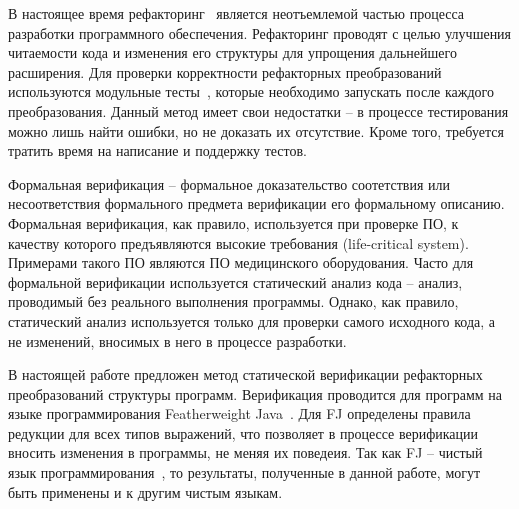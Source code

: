 \startprefacepage

В настоящее время рефакторинг~\cite{refactoring} является неотъемлемой частью процесса разработки программного обеспечения.
Рефакторинг проводят с целью улучшения читаемости кода и изменения его структуры для упрощения дальнейшего расширения.
Для проверки корректности рефакторных преобразований используются модульные тесты~\cite{tdd},
которые необходимо запускать после каждого преобразования.
Данный метод имеет свои недостатки -- в процессе тестирования можно лишь найти ошибки, но не доказать их отсутствие. 
Кроме того, требуется тратить время на написание и поддержку тестов.

Формальная верификация -- формальное доказательство соотетствия или несоответствия формального предмета верификации его формальному описанию.
Формальная верификация, как правило, используется при проверке ПО, к качеству которого предъявляются высокие требования (life-critical system).
Примерами такого ПО являются ПО медицинского оборудования.
Часто для формальной верификации используется статический анализ кода -- анализ, проводимый без реального выполнения программы.
Однако, как правило, статический анализ используется только для проверки самого исходного кода, а не изменений, вносимых в него в процессе разработки.

В настоящей работе предложен метод статической верификации рефакторных преобразований структуры программ.
Верификация проводится для программ на языке программирования Featherweight Java~\cite{fj}.
Для FJ определены правила редукции для всех типов выражений, что позволяет в процессе верификации вносить изменения в программы, не меняя их поведеия.
Так как FJ -- чистый язык программирования~\cite{Sondergaard:1990:RTD:79245.79247}, то результаты, полученные в данной работе,
могут быть применены и к другим чистым языкам.